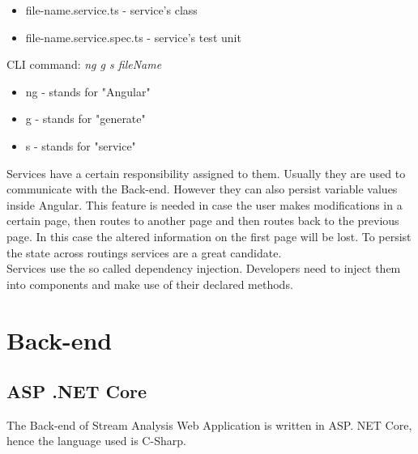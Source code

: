\begin{itemize}
	\item file-name.service.ts - service's class
	\item file-name.service.spec.ts - service's test unit
\end{itemize}

CLI command: \textit{ng g s fileName}

\begin{itemize}
	\item ng - stands for "Angular"
	\item g - stands for "generate"
	\item s - stands for "service"
\end{itemize}


Services have a certain responsibility assigned to them. Usually they are used to communicate with the Back-end. However they can also persist variable values inside Angular. This feature is needed in case the user makes modifications in a certain page, then routes to another page and then routes back to the previous page. In this case the altered information on the first page will be lost. To persist the state across routings services are a great candidate.\\

Services use the so called dependency injection. Developers need to inject them into components and make use of their declared methods. \\

\section{Back-end}
\label{chap:04:02}

\subsection{ASP .NET Core}
\label{chap:04:02:01}

The Back-end of Stream Analysis Web Application is written in ASP. NET Core, hence the language used is C-Sharp.\\

